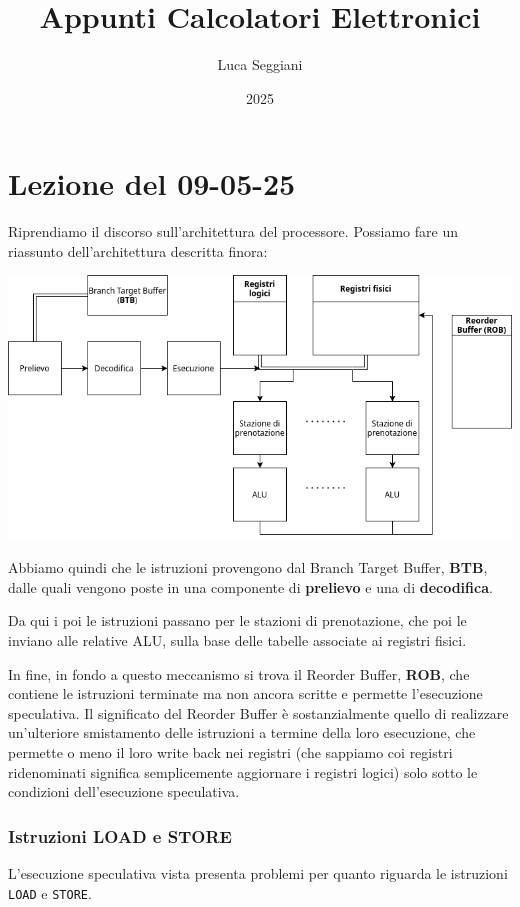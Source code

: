 \documentclass[a4paper,11pt]{article}
\title{Appunti Calcolatori Elettronici}
\author{Luca Seggiani}
\date{2025}
\begin{document}
\section{Lezione del 09-05-25}

\thispagestyle{empty}
\pagestyle{fancy}

Riprendiamo il discorso sull'architettura del processore.
Possiamo fare un riassunto dell'architettura descritta finora:
\begin{center}
	\includegraphics[scale=.55]{../figures/arch1.png}
\end{center}

Abbiamo quindi che le istruzioni provengono dal Branch Target Buffer, \textbf{BTB}, dalle quali vengono poste in una componente di \textbf{prelievo} e una di \textbf{decodifica}.

Da qui i poi le istruzioni passano per le stazioni di prenotazione, che poi le inviano alle relative ALU, sulla base delle tabelle associate ai registri fisici.

In fine, in fondo a questo meccanismo si trova il Reorder Buffer, \textbf{ROB}, che contiene le istruzioni terminate ma non ancora scritte e permette l'esecuzione speculativa.
Il significato del Reorder Buffer è sostanzialmente quello di realizzare un'ulteriore smistamento delle istruzioni a termine della loro esecuzione, che permette o meno il loro write back nei registri (che sappiamo coi registri ridenominati significa semplicemente aggiornare i registri logici) solo sotto le condizioni dell'esecuzione speculativa.

\subsubsection{Istruzioni LOAD e STORE}
L'esecuzione speculativa vista presenta problemi per quanto riguarda le istruzioni \lstinline|LOAD| e \lstinline|STORE|.
\end{document}
